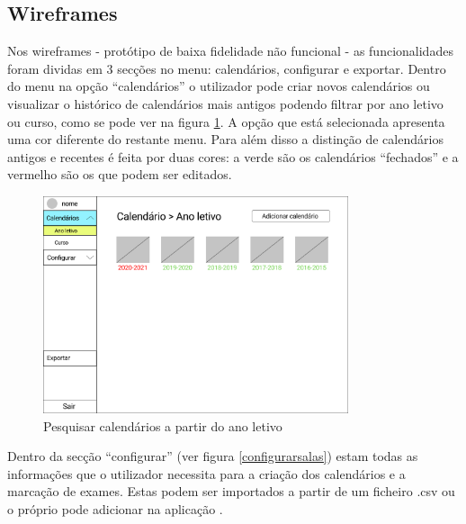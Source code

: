 \documentclass[11pt, twoside]{report}
\begin{document}
	\subsection{Wireframes}
	
	Nos wireframes - protótipo de baixa fidelidade não funcional - as funcionalidades foram dividas em 3 secções no menu: calendários, configurar e exportar. Dentro do menu na opção ``calendários'' o utilizador pode criar novos calendários ou visualizar o histórico de calendários mais antigos podendo filtrar por ano letivo ou curso, como se pode ver na figura \ref{menucalendario}. A opção que está selecionada apresenta uma cor diferente do restante menu. Para além disso a distinção de calendários antigos e recentes é feita por duas cores: a verde são os calendários ``fechados'' e a vermelho são os que podem ser editados. 
	
	\begin{figure}[H] 
		\centering 
		\includegraphics[width=0.8\textwidth,height=0.8\textheight,keepaspectratio]{image/prototipowireframes/pesquisacalendarioanoletivo}
		\caption{Pesquisar calendários a partir do ano letivo}
		\label{menucalendario}
	\end{figure}
	
	Dentro da secção ``configurar'' (ver figura \ref{configurarsalas}) estam todas as informações que o utilizador necessita para a criação dos calendários e a marcação de exames. Estas podem ser importados a partir de um ficheiro .csv ou o próprio pode adicionar na aplicação . 
	
\end{document}
